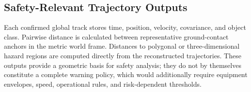 \subsection{Safety-Relevant Trajectory Outputs}
Each confirmed global track stores time, position, velocity, covariance, and object class. Pairwise distance is calculated between representative ground-contact anchors in the metric world frame. Distances to polygonal or three-dimensional hazard regions are computed directly from the reconstructed trajectories. These outputs provide a geometric basis for safety analysis; they do not by themselves constitute a complete warning policy, which would additionally require equipment envelopes, speed, operational rules, and risk-dependent thresholds.
